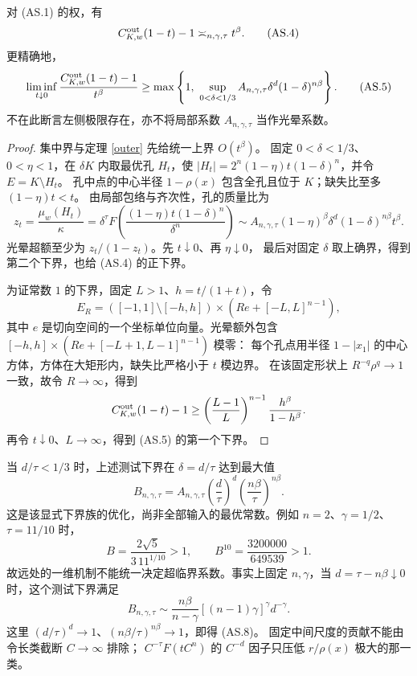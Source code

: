\begin{proposition}[匹配阶及显式光晕下界]\label{prop:supercritical-order}
对 (AS.1) 的权，有
\[
 C^{\rm out}_{K,w}(1-t)-1\asymp_{n,\gamma,\tau}t^\beta. \tag{AS.4}
\]
更精确地，
\[
 \liminf_{t\downarrow0}\frac{C^{\rm out}_{K,w}(1-t)-1}{t^\beta}
 \ge\max\left\{1,\ \sup_{0<\delta<1/3}
 A_{n,\gamma,\tau}\delta^d(1-\delta)^{n\beta}\right\}. \tag{AS.5}
\]
不在此断言左侧极限存在，亦不将局部系数 $A_{n,\gamma,\tau}$ 当作光晕系数。
\end{proposition}
\begin{proof}
集中界与定理 \ref{outer} 先给统一上界 $O(t^\beta)$。
固定 $0<\delta<1/3$、$0<\eta<1$，在 $\delta K$ 内取最优孔 $H_t$，使
$|H_t|=2^n(1-\eta)t(1-\delta)^n$，并令 $E=K\setminus H_t$。
孔中点的中心半径 $1-\rho(x)$ 包含全孔且位于 $K$；缺失比至多 $(1-\eta)t<t$。
由局部包络与齐次性，孔的质量比为
\[
 z_t=\frac{\mu_w(H_t)}\kappa
 =\delta^\tau F\!\left(\frac{(1-\eta)t(1-\delta)^n}{\delta^n}\right)
 \sim A_{n,\gamma,\tau}(1-\eta)^\beta\delta^d(1-\delta)^{n\beta}t^\beta.
\]
光晕超额至少为 $z_t/(1-z_t)$。先 $t\downarrow0$、再 $\eta\downarrow0$，
最后对固定 $\delta$ 取上确界，得到第二个下界，也给 (AS.4) 的正下界。

为证常数 $1$ 的下界，固定 $L>1$、$h=t/(1+t)$，令
\[
 E_R=([-1,1]\setminus[-h,h])\times(Re+[-L,L]^{n-1}),
\]
其中 $e$ 是切向空间的一个坐标单位向量。光晕额外包含
$[-h,h]\times(Re+[-L+1,L-1]^{n-1})$ 模零：
每个孔点用半径 $1-|x_1|$ 的中心方体，方体在大矩形内，缺失比严格小于 $t$ 模边界。
在该固定形状上 $R^{-q}\rho^q\to1$ 一致，故令 $R\to\infty$，得到
\[
 C^{\rm out}_{K,w}(1-t)-1\ge
 \left(\frac{L-1}{L}\right)^{n-1}\frac{h^\beta}{1-h^\beta}.
\]
再令 $t\downarrow0$、$L\to\infty$，得到 (AS.5) 的第一个下界。
\end{proof}

当 $d/\tau<1/3$ 时，上述测试下界在 $\delta=d/\tau$ 达到最大值
\[
 B_{n,\gamma,\tau}=A_{n,\gamma,\tau}
 \left(\frac d\tau\right)^d\left(\frac{n\beta}\tau\right)^{n\beta}. \tag{AS.6}
\]
这是该显式下界族的优化，尚非全部输入的最优常数。例如 $n=2$、$\gamma=1/2$、$\tau=11/10$ 时，
\[
 B=\frac{2\sqrt5}{3\,11^{1/10}}>1,
 \qquad B^{10}=\frac{3200000}{649539}>1. \tag{AS.7}
\]
故远处的一维机制不能统一决定超临界系数。事实上固定 $n,\gamma$，当
$d=\tau-n\beta\downarrow0$ 时，这个测试下界满足
\[
 B_{n,\gamma,\tau}\sim
 \frac{n\beta}{n-\gamma}[(n-1)\gamma]^\gamma d^{-\gamma}. \tag{AS.8}
\]
这里 $(d/\tau)^d\to1$、$(n\beta/\tau)^{n\beta}\to1$，即得 (AS.8)。
固定中间尺度的贡献不能由令长类截断 $C\to\infty$ 排除；
$C^{-\tau}F(tC^n)$ 的 $C^{-d}$ 因子只压低 $r/\rho(x)$ 极大的那一类。

